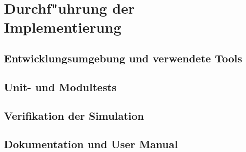 \chapter{Durchf"uhrung der Implementierung}
\section{Entwicklungsumgebung und verwendete Tools}
\section{Unit- und Modultests}
\section{Verifikation der Simulation}
\section{Dokumentation und User Manual}

